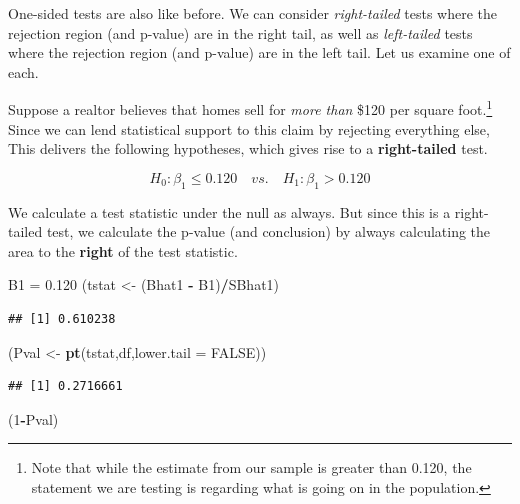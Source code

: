 \documentclass[
]{book}
\newenvironment{Shaded}{\begin{snugshade}}{\end{snugshade}}
\newcommand{\AttributeTok}[1]{\textcolor[rgb]{0.13,0.29,0.53}{#1}}
\newcommand{\ConstantTok}[1]{\textcolor[rgb]{0.56,0.35,0.01}{#1}}
\newcommand{\DecValTok}[1]{\textcolor[rgb]{0.00,0.00,0.81}{#1}}
\newcommand{\FloatTok}[1]{\textcolor[rgb]{0.00,0.00,0.81}{#1}}
\newcommand{\FunctionTok}[1]{\textcolor[rgb]{0.13,0.29,0.53}{\textbf{#1}}}
\newcommand{\NormalTok}[1]{#1}
\newcommand{\OtherTok}[1]{\textcolor[rgb]{0.56,0.35,0.01}{#1}}
\newcommand{\SpecialCharTok}[1]{\textcolor[rgb]{0.81,0.36,0.00}{\textbf{#1}}}
\begin{document}
One-sided tests are also like before. We can consider \emph{right-tailed} tests where the rejection region (and p-value) are in the right tail, as well as \emph{left-tailed} tests where the rejection region (and p-value) are in the left tail. Let us examine one of each.

Suppose a realtor believes that homes sell for \emph{more than} \$120 per square foot.\footnote{Note that while the estimate from our sample is greater than 0.120, the statement we are testing is regarding what is going on in the population.} Since we can lend statistical support to this claim by rejecting everything else, This delivers the following hypotheses, which gives rise to a \textbf{right-tailed} test.

\[H_0:\beta_1\leq0.120 \quad vs. \quad H_1:\beta_1>0.120\]

We calculate a test statistic under the null as always. But since this is a right-tailed test, we calculate the p-value (and conclusion) by always calculating the area to the \textbf{right} of the test statistic.

\begin{Shaded}
\begin{Highlighting}[]
\NormalTok{B1 }\OtherTok{=} \FloatTok{0.120}
\NormalTok{(tstat }\OtherTok{\textless{}{-}}\NormalTok{ (Bhat1 }\SpecialCharTok{{-}}\NormalTok{ B1)}\SpecialCharTok{/}\NormalTok{SBhat1)}
\end{Highlighting}
\end{Shaded}

\begin{verbatim}
## [1] 0.610238
\end{verbatim}

\begin{Shaded}
\begin{Highlighting}[]
\NormalTok{(Pval }\OtherTok{\textless{}{-}} \FunctionTok{pt}\NormalTok{(tstat,df,}\AttributeTok{lower.tail =} \ConstantTok{FALSE}\NormalTok{))}
\end{Highlighting}
\end{Shaded}

\begin{verbatim}
## [1] 0.2716661
\end{verbatim}

\begin{Shaded}
\begin{Highlighting}[]
\NormalTok{(}\DecValTok{1}\SpecialCharTok{{-}}\NormalTok{Pval)}
\end{Highlighting}
\end{Shaded}
\end{document}
